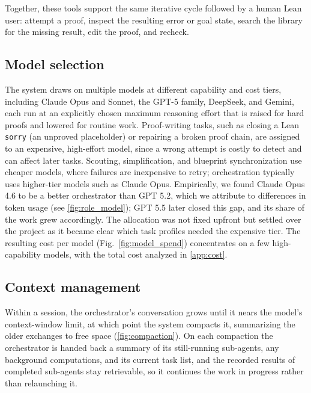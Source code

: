 Together, these tools support the same iterative cycle followed by a human Lean user: attempt a proof, inspect the resulting error or goal state, search the library for the missing result, edit the proof, and recheck.



\subsection{Model selection}\label{sec:model_selection}

The system draws on multiple models at different capability and cost tiers, including Claude Opus and Sonnet, the GPT-5 family, DeepSeek, and Gemini, each run at an explicitly chosen maximum reasoning effort that is raised for hard proofs and lowered for routine work. Proof-writing tasks, such as closing a Lean \texttt{sorry} (an unproved placeholder) or repairing a broken proof chain, are assigned to an expensive, high-effort model, since a wrong attempt is costly to detect and can affect later tasks. Scouting, simplification, and blueprint synchronization use cheaper models, where failures are inexpensive to retry; orchestration typically uses higher-tier models such as Claude Opus. Empirically, we found Claude Opus 4.6 to be a better orchestrator than GPT 5.2, which we attribute to differences in token usage (see \cref{fig:role_model}); GPT 5.5 later closed this gap, and its share of the work grew accordingly.
The allocation was not fixed upfront but settled over the project as it became clear which task profiles needed the expensive tier. The resulting cost per model (Fig.~\ref{fig:model_spend}) concentrates on a few high-capability models, with the total cost analyzed in \cref{app:cost}.


\subsection{Context management}

Within a session, the orchestrator's conversation grows until it nears the model's context-window limit, at which point the system compacts it, summarizing the older exchanges to free space (\cref{fig:compaction}). On each compaction the orchestrator is handed back a summary of its still-running sub-agents, any background computations, and its current task list, and the recorded results of completed sub-agents stay retrievable, so it continues the work in progress rather than relaunching it.




